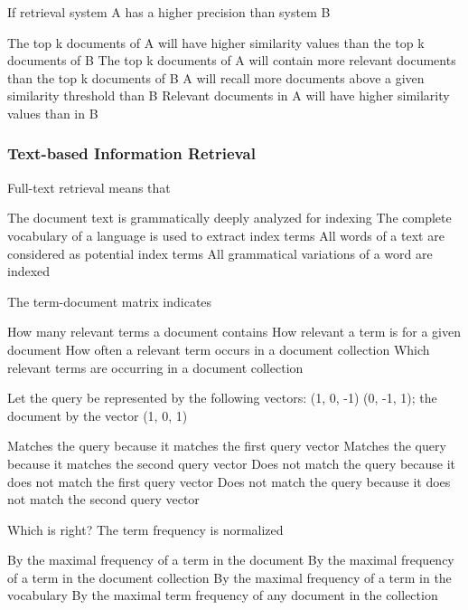 \documentclass[12pt,a4paper,answers]{exam} %
\begin{document}
\begin{flushleft}
\begin{multicols*}{2}
\begin{questions}
\question If retrieval system A has a higher precision than system B
\begin{checkboxes}
\choice The top k documents of A will have higher similarity values than the top k documents of B
\CorrectChoice The top k documents of A will contain more relevant documents than the top k documents of B
\choice A will recall more documents above a given similarity threshold than B
\choice Relevant documents in A will have higher similarity values than in B
\end{checkboxes}

\subsubsection{Text-based Information Retrieval}
\question Full-text retrieval means that
\begin{checkboxes}
\choice The document text is grammatically deeply analyzed for indexing
\choice The complete vocabulary of a language is used to extract index terms
\CorrectChoice All words of a text are considered as potential index terms
\choice All grammatical variations of a word are indexed
\end{checkboxes}

\question The term-document matrix indicates
\begin{checkboxes}
\CorrectChoice How many relevant terms a document contains
\choice How relevant a term is for a given document
\CorrectChoice How often a relevant term occurs in a document collection
\CorrectChoice Which relevant terms are occurring in a document collection
\end{checkboxes}

\question Let the query be represented by the following vectors:
(1, 0, -1) (0, -1, 1); the document by the vector (1, 0, 1)
\begin{checkboxes}
\choice Matches the query because it matches the first query vector
\CorrectChoice Matches the query because it matches the second query vector
\choice Does not match the query because it does not match the first query vector
\choice Does not match the query because it does not match the second query vector
\end{checkboxes}

\question Which is right? The term frequency is normalized
\begin{checkboxes}
\CorrectChoice By the maximal frequency of a term in the document
\choice By the maximal frequency of a term in the document collection
\choice By the maximal frequency of a term in the vocabulary
\choice By the maximal term frequency of any document in the collection
\end{checkboxes}



\end{questions}
\end{multicols*}
\end{flushleft}
\end{document}
